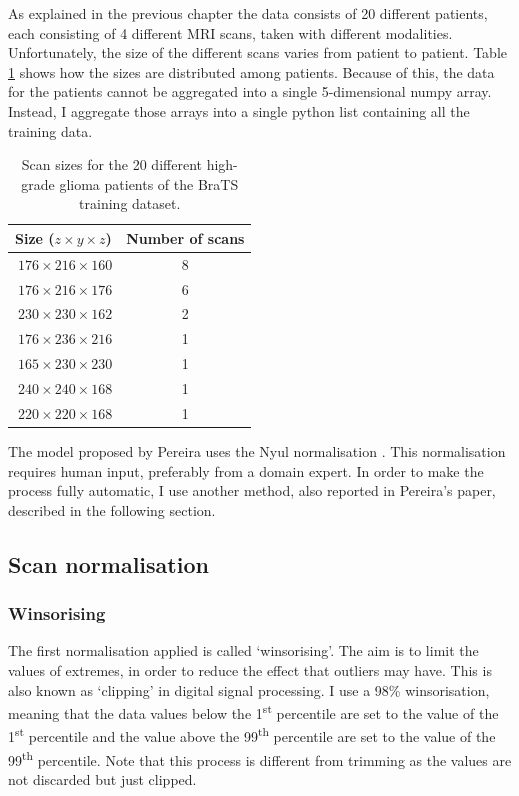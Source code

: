 \documentclass[12pt,a4paper,twoside,openright]{report}
\begin{document}
As explained in the previous chapter the data consists of 20 different patients, each consisting of 4 different MRI scans, taken with different modalities. Unfortunately, the size of the different scans varies from patient to patient. Table \ref{table:scan_sizes} shows how the sizes are distributed among patients. Because of this, the data for the patients cannot be aggregated into a single 5-dimensional numpy array. Instead, I aggregate those arrays into a single python list containing all the training data.

\begin{table}[h]
\centering	
\begin{tabular}{ m{3.5cm} c } 
\textbf{Size ($z \times y \times z$)} & \textbf{Number of scans}\\
 \hline
 $\ 176 \times 216 \times 160$ & 8 \\ 
 $\ 176 \times 216 \times 176$ & 6 \\ 
 $\ 230 \times 230 \times 162$ & 2 \\ 
 $\ 176 \times 236 \times 216$ & 1 \\ 
 $\ 165 \times 230 \times 230$ & 1 \\ 
 $\ 240 \times 240 \times 168$ & 1 \\ 
 $\ 220 \times 220 \times 168$ & 1 \\ 
\end{tabular}
\caption[Scan sizes for the 20 different patients of the training dataset.]{Scan sizes for the 20 different high-grade glioma patients of the BraTS training dataset.}
\label{table:scan_sizes}
\end{table}

The model proposed by Pereira \cite{pereira} uses the Nyul normalisation \cite{nyul}. This normalisation requires human input, preferably from a domain expert. In order to make the process fully automatic, I use another method, also reported in Pereira's paper, described in the following section.

\subsection{Scan normalisation}
\label{section:scan_normalisations}
\subsubsection{Winsorising}
The first normalisation applied is called `winsorising'. The aim is to limit the values of extremes, in order to reduce the effect that outliers may have. This is also known as `clipping' in digital signal processing. I use a 98\% winsorisation, meaning that the data values below the 1\textsuperscript{st} percentile are set to the value of the 1\textsuperscript{st} percentile and the value above the 99\textsuperscript{th} percentile are set to the value of the 99\textsuperscript{th} percentile. Note that this process is different from trimming as the values are not discarded but just clipped.
\end{document}

